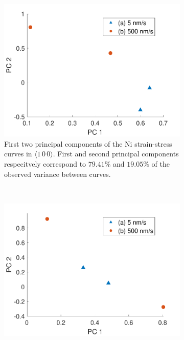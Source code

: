 \begin{figure}
    \centering
    \begin{subfigure}[t]{0.45\linewidth}
        \centering
        \includegraphics[width=\linewidth]{../data/Ni100_pca.pdf}
        \caption[First two principal components of the Ni strain-stress curves in $\langle 1\,0\,0 \rangle$.]{First two principal components of the Ni strain-stress curves in $\langle 1\,0\,0 \rangle$. First and second principal components respecitvely correspond to $79.41\%$ and $19.05\%$ of the observed variance between curves.}
        \label{sf:Ni100_pca}
    \end{subfigure}
    ~
    \begin{subfigure}[t]{0.45\linewidth}
        \centering
        \includegraphics[width=\linewidth]{../data/Ni110_pca.pdf}

\end{subfigure}
\end{figure}
